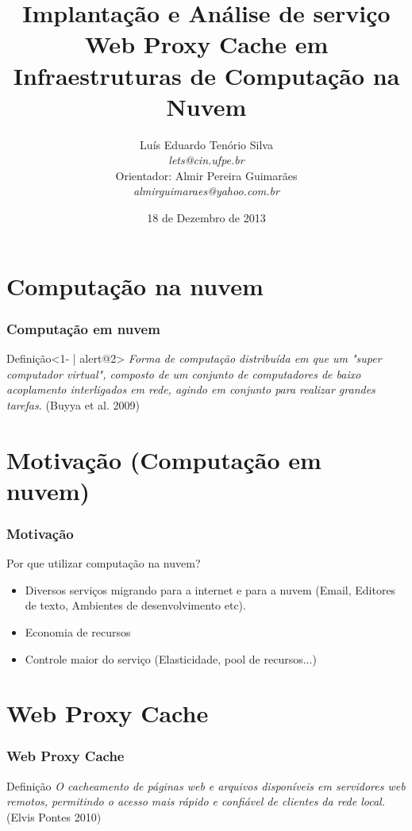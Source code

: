 \documentclass{beamer}
\title[TCC]{Implantação e Análise de serviço Web Proxy Cache em Infraestruturas de Computação na Nuvem}
\author{Luís Eduardo Tenório Silva\\\textit{lets@cin.ufpe.br}\\Orientador: Almir Pereira Guimarães\\\textit{almirguimaraes@yahoo.com.br}}
\date[18/12/13]{18 de Dezembro de 2013}
\begin{document}
    \frame{\titlepage}

    \frame{\footnotesize{\tableofcontents}}
    \section{Computação na nuvem}
    \begin{frame}
      \frametitle{Computação em nuvem}
    \begin{block}{Definição}<1- | alert@2>
      \textit{Forma de computação distribuída em que um "super computador virtual", composto de um conjunto de computadores de baixo
acoplamento interligados em rede, agindo em conjunto para realizar grandes tarefas.} (Buyya et al. 2009)
     \end{block}       
    \end{frame}
    \section{Motivação (Computação em nuvem)}
    \begin{frame}
      \frametitle{Motivação}
      Por que utilizar computação na nuvem?
      \begin{itemize}
       \item <2->Diversos serviços migrando para a internet e para a nuvem (Email, Editores de texto, Ambientes de desenvolvimento etc).
       \item <3->Economia de recursos
       \item <4->Controle maior do serviço (Elasticidade, pool de recursos...)
      \end{itemize}
    \end{frame}
    \section{Web Proxy Cache}
    \begin{frame}
      \frametitle{Web Proxy Cache}
      \begin{block}{Definição}
	\textit{O cacheamento de páginas web e arquivos disponíveis em servidores web remotos, permitindo o acesso mais rápido e
confiável de clientes da rede local.} (Elvis Pontes 2010)
      \end{block}
    \end{frame}
\end{document}

